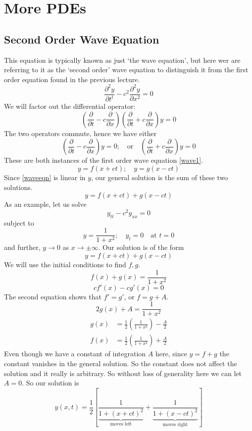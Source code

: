 \documentclass{article}
\begin{document}
\section{More PDEs}
\subsection{Second Order Wave Equation}
This equation is typically known as just `the wave equation', but here wer are referring to it as the `second order' wave equation to distinguish it from the first order equation found in the previous lecture.
\begin{equation}\label{waveeqn}
	\frac{\partial^2 y}{\partial t^t} - c^2 \frac{\partial^2 y}{\partial x^2} = 0
\end{equation}
We will factor out the differential operator:
\[ \left( \frac{\partial}{\partial t} - c\frac{\partial}{\partial x} \right)\left( \frac{\partial}{\partial t} + c\frac{\partial}{\partial x} \right)y = 0 \]
The two operators commute, hence we have either
\[ \left( \frac{\partial}{\partial t} - c\frac{\partial}{\partial x} \right) y = 0;\quad\text{or}\quad \left( \frac{\partial}{\partial t} + c\frac{\partial}{\partial x} \right) y = 0 \]
These are both instances of the first order wave equation \eqref{wave1}.
\[ y = f(x+ct);\quad y=g(x-ct) \]
Since \eqref{waveeqn} is linear in $y$, our general solution is the sum of these two solutions.
\[ y = f(x+ct) + g(x-ct) \]
As an example, let us solve
\[ y_{tt} - c^2 y_{xx} = 0 \]
subject to
\[ y = \frac{1}{1+x^2}; \quad y_t = 0\quad \text{at }t=0 \]
and further, $y \to 0$ as $x \to \pm \infty$. Our solution is of the form
\[ y = f(x+ct) + g(x-ct) \]
We will use the initial conditions to find $f, g$.
\[ f(x) + g(x) = \frac{1}{1+x^2} \]
\[ cf'(x) - cg'(x) = 0 \]
The second equation shows that $f'=g'$, or $f=g+A$.
\[ 2g(x) + A = \frac{1}{1+x^2} \]
\begin{align*}
	g(x) & = \frac{1}{2}\left( \frac{1}{1+x^2} \right) - \frac{A}{2} \\
	f(x) & = \frac{1}{2}\left( \frac{1}{1+x^2} \right) + \frac{A}{2}
\end{align*}
Even though we have a constant of integration $A$ here, since $y=f+g$ the constant vanishes in the general solution. So the constant does not affect the solution and it really is arbitrary. So without loss of generality here we can let $A = 0$. So our solution is
\[ y(x, t) = \frac{1}{2}\left[ \underbrace{\frac{1}{1+(x+ct)^2}}_{\text{moves left}} + \underbrace{\frac{1}{1+(x-ct)^2}}_{\text{moves right}} \right] \]
\end{document}
